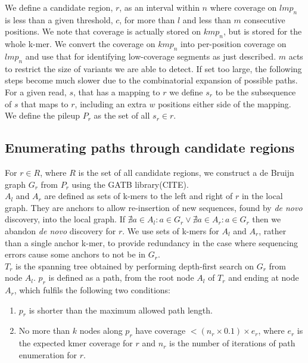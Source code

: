 We define a candidate region, $r$, as an interval within $n$ where coverage on $lmp_n$ is less than a given threshold, $c$, for more than $l$ and less than $m$ consecutive positions. We note that coverage is actually stored on $kmp_n$, but is stored for the whole k-mer. We convert the coverage on $kmp_n$ into per-position coverage on $lmp_n$ and use that for identifying low-coverage segments as just described. $m$ acts to restrict the size of variants we are able to detect. If set too large, the following steps become much slower due to the combinatorial expansion of possible paths. \\
For a given read, $s$, that has a mapping to $r$ we define $s_r$ to be the subsequence of $s$ that maps to $r$, including an extra $w$ positions either side of the mapping. We define the pileup $P_r$ as the set of all $s_r \in r$.

\subsection{Enumerating paths through candidate regions}

For $r \in R$, where $R$ is the set of all candidate regions, we construct a de Bruijn graph $G_r$ from $P_r$ using the GATB library(CITE). \\
$A_l$ and $A_r$ are defined as sets of k-mers to the left and right of $r$ in the local graph. They are anchors to allow re-insertion of new sequences, found by \textit{de novo} discovery, into the local graph. If  $\nexists a \in A_l : a \in G_r \lor \nexists a \in A_r : a \in G_r$ then we abandon \textit{de novo} discovery for $r$. We use sets of k-mers for $A_l$ and $A_r$, rather than a single anchor k-mer, to provide redundancy in the case where sequencing errors cause some anchors to not be in $G_r$. \\
$T_r$ is the spanning tree obtained by performing depth-first search on $G_r$ from node $A_l$. $p_r$ is defined as a path, from the root node $A_l$ of $T_r$ and ending at node $A_r$, which fulfils the following two conditions:

\begin{enumerate}
  \item $p_r$ is shorter than the maximum allowed path length.
  \item No more than $k$ nodes along $p_r$ have coverage $< (n_r \times 0.1) \times e_r$, where $e_r$ is the expected kmer coverage for $r$ and $n_r$ is the number of iterations of path enumeration for $r$.
\end{enumerate}

